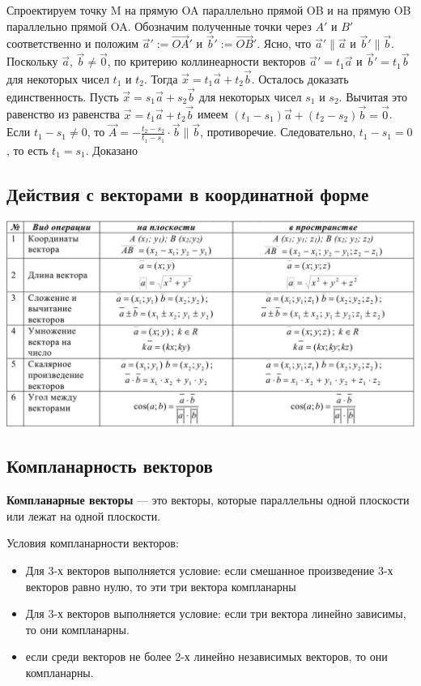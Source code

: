 \documentclass[a4paper]{article}
\begin{document}
Спроектируем точку M на прямую OA параллельно прямой OB и на прямую OB параллельно прямой OA. Обозначим полученные точки через $A'$ и $B'$ соответственно и положим  $\vec{a}' := \overrightarrow{OA}'$ и $\vec{b}' := \overrightarrow{OB}'$. Ясно, что $\vec{a}' \parallel \vec{a}$ и $\vec{b}' \parallel \vec{b}$. Поскольку $\vec{a}$, $\vec{b} \neq \vec{0}$, по критерию коллинеарности векторов $\vec{a}' = t_1 \vec{a}$ и $\vec{b}' = t_1 \vec{b}$ для некоторых чисел $t_1$ и $t_2$.
Тогда $\vec{x} = t_1 \vec{a} + t_2 \vec{b}$.
Осталось доказать единственность. Пусть $\vec{x} = s_1 \vec{a} + s_2 \vec{b}$ для некоторых  чисел $s_1$ и $s_2$.
Вычитая это равенство из равенства $\vec{x} = t_1 \vec{a} + t_2 \vec{b}$
имеем $(t_1 - s_1) \vec{a} + (t_2 - s_2) \vec{b} = \vec{0}$.
Если $t_1-s_1 \neq 0$, то $\displaystyle \vec{A} = - \frac{t_2 - s_2}{t_1 - s_1} \cdot \vec{b} \parallel \vec{b}$, противоречие.
Следовательно, $t_1 - s_1 = 0$, то есть $t_1 = s_1$. Доказано


\subsection*{Действия с векторами в координатной форме}

\includegraphics[width=18cm]{t2}

\newpage \begin{center}\begin{Large}\end{Large}\end{center}
\subsection*{Компланарность векторов}
\textbf{Компланарные векторы} — это векторы, которые параллельны одной плоскости или лежат на одной плоскости. 

Условия компланарности векторов:\begin{itemize}
\item Для 3-х векторов выполняется условие: если смешанное произведение 3-х векторов равно нулю, то эти три вектора компланарны
\item Для 3-х векторов выполняется условие: если три вектора линейно зависимы, то они компланарны.
\item если среди векторов не более 2-х линейно независимых векторов, то они компланарны.
\end{itemize}
\end{document}

